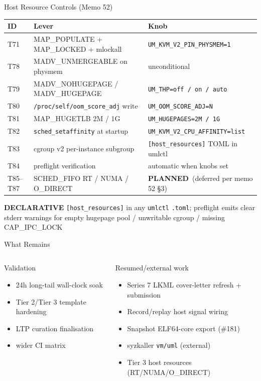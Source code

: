 \documentclass[aspectratio=169,11pt]{beamer}
\newcommand{\pill}[2]{\colorbox{#1!14}{\textcolor{#1}{\footnotesize\textbf{#2}}}}
\newcommand{\planned}{\pill{UMLBlue}{PLANNED}}
\begin{document}
\begin{frame}{Host Resource Controls (Memo 52)}
\scriptsize
\begin{tabularx}{\textwidth}{@{}p{}p{}X@{}}
\toprule
ID & Lever & Knob \\
\midrule
T71 & MAP\_POPULATE + MAP\_LOCKED + mlockall & \texttt{UM\_KVM\_V2\_PIN\_PHYSMEM=1} \\
T78 & MADV\_UNMERGEABLE on physmem & unconditional \\
T79 & MADV\_NOHUGEPAGE / MADV\_HUGEPAGE & \texttt{UM\_THP=off / on / auto} \\
T80 & \texttt{/proc/self/oom\_score\_adj} write & \texttt{UM\_OOM\_SCORE\_ADJ=N} \\
T81 & MAP\_HUGETLB 2M / 1G & \texttt{UM\_HUGEPAGES=2M / 1G} \\
T82 & \texttt{sched\_setaffinity} at startup & \texttt{UM\_KVM\_V2\_CPU\_AFFINITY=list} \\
T83 & cgroup v2 per-instance subgroup & \texttt{[host\_resources]} TOML in umlctl \\
T84 & preflight verification & automatic when knobs set \\
T85--T87 & SCHED\_FIFO RT / NUMA / O\_DIRECT & \planned~(deferred per memo 52 \S3) \\
\bottomrule
\end{tabularx}
\vspace{0.4em}
\centering
\pill{UMLBlue}{DECLARATIVE}\quad
\texttt{[host\_resources]} in any \texttt{umlctl} \texttt{.toml}; preflight emits clear stderr warnings for empty hugepage pool / unwritable cgroup / missing CAP\_IPC\_LOCK
\end{frame}

\begin{frame}{What Remains}
\begin{columns}[T,onlytextwidth]
\begin{block}{Validation}
\begin{itemize}
  \item 24h long-tail wall-clock soak
  \item Tier 2/Tier 3 template hardening
  \item LTP curation finalisation
  \item wider CI matrix
\end{itemize}
\end{block}
\begin{block}{Resumed/external work}
\begin{itemize}
  \item Series 7 LKML cover-letter refresh + submission
  \item Record/replay host signal wiring
  \item Snapshot ELF64-core export (\#181)
  \item syzkaller \texttt{vm/uml} (external)
  \item Tier 3 host resources (RT/NUMA/O\_DIRECT)
\end{itemize}
\end{block}
\end{columns}
\end{frame}
\end{document}
